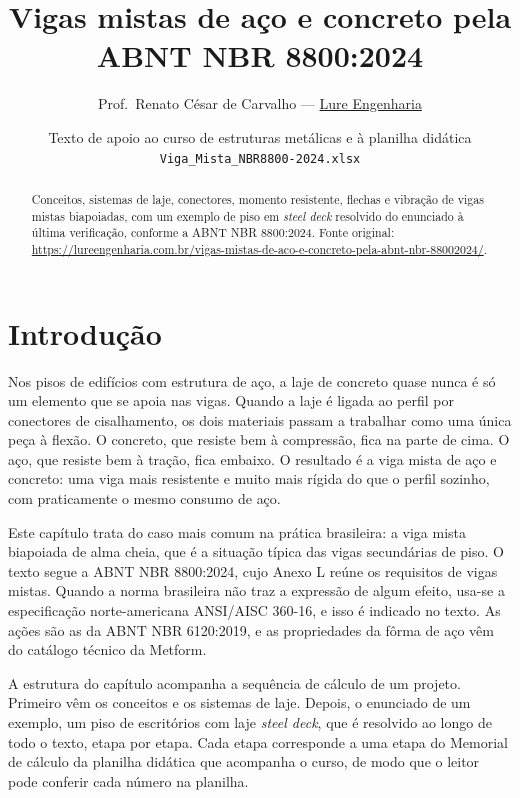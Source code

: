 \documentclass[11pt,a4paper]{article}
\title{\textbf{\color{primary}Vigas mistas de aço e concreto pela ABNT NBR 8800:2024}}
\author{Prof.\ Renato César de Carvalho --- \href{https://lureengenharia.com.br/vigas-mistas-de-aco-e-concreto-pela-abnt-nbr-88002024/}{Lure Engenharia}}
\date{Texto de apoio ao curso de estruturas metálicas e à planilha didática \texttt{Viga\_Mista\_NBR8800-2024.xlsx}}
\begin{document}
\maketitle

\begin{abstract}
\noindent Conceitos, sistemas de laje, conectores, momento resistente, flechas e vibração de vigas mistas biapoiadas, com um exemplo de piso em \textit{steel deck} resolvido do enunciado à última verificação, conforme a ABNT NBR 8800:2024. Fonte original: \url{https://lureengenharia.com.br/vigas-mistas-de-aco-e-concreto-pela-abnt-nbr-88002024/}.
\end{abstract}

\tableofcontents
\newpage

\section{Introdução}

Nos pisos de edifícios com estrutura de aço, a laje de concreto quase nunca é só um elemento que se apoia nas vigas. Quando a laje é ligada ao perfil por conectores de cisalhamento, os dois materiais passam a trabalhar como uma única peça à flexão. O concreto, que resiste bem à compressão, fica na parte de cima. O aço, que resiste bem à tração, fica embaixo. O resultado é a viga mista de aço e concreto: uma viga mais resistente e muito mais rígida do que o perfil sozinho, com praticamente o mesmo consumo de aço.

Este capítulo trata do caso mais comum na prática brasileira: a viga mista biapoiada de alma cheia, que é a situação típica das vigas secundárias de piso. O texto segue a ABNT NBR 8800:2024, cujo Anexo L reúne os requisitos de vigas mistas. Quando a norma brasileira não traz a expressão de algum efeito, usa-se a especificação norte-americana ANSI/AISC 360-16, e isso é indicado no texto. As ações são as da ABNT NBR 6120:2019, e as propriedades da fôrma de aço vêm do catálogo técnico da Metform.

A estrutura do capítulo acompanha a sequência de cálculo de um projeto. Primeiro vêm os conceitos e os sistemas de laje. Depois, o enunciado de um exemplo, um piso de escritórios com laje \textit{steel deck}, que é resolvido ao longo de todo o texto, etapa por etapa. Cada etapa corresponde a uma etapa do Memorial de cálculo da planilha didática que acompanha o curso, de modo que o leitor pode conferir cada número na planilha.
\end{document}
